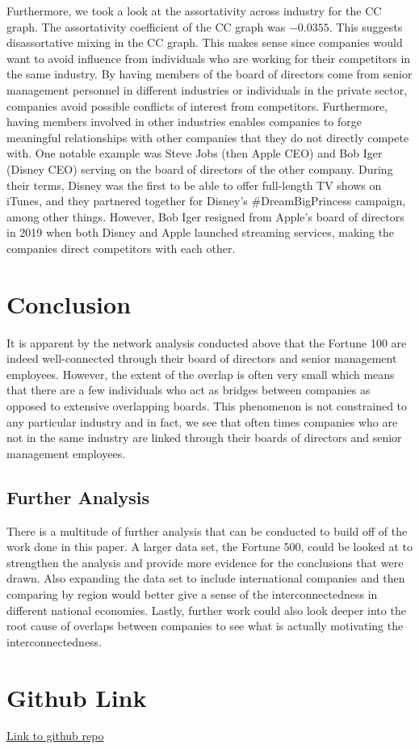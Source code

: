\documentclass[a4paper]{article}
\begin{document}
Furthermore, we took a look at the assortativity across industry for the CC graph. The assortativity coefficient of the CC graph was $-0.0355$. This suggests disassortative mixing in the CC graph. This makes sense since companies would want to avoid influence from individuals who are working for their competitors in the same industry. By having members of the board of directors come from senior management personnel in different industries or individuals in the private sector, companies avoid possible conflicts of interest from competitors. Furthermore, having members involved in other industries enables companies to forge meaningful relationships with other companies that they do not directly compete with. One notable example was Steve Jobs (then Apple CEO) and Bob Iger (Disney CEO) serving on the board of directors of the other company. During their terms, Disney was the first to be able to offer full-length TV shows on iTunes, and they partnered together for Disney's \#DreamBigPrincess campaign, among other things. However, Bob Iger resigned from Apple's board of directors in 2019 when both Disney and Apple launched streaming services, making the companies direct competitors with each other. 

\newpage
\section*{Conclusion}
It is apparent by the network analysis conducted above that the Fortune 100 are indeed well-connected through their board of directors and senior management employees. However, the extent of the overlap is often very small which means that there are a few individuals who act as bridges between companies as opposed to extensive overlapping boards. This phenomenon is not constrained to any particular industry and in fact, we see that often times companies who are not in the same industry are linked through their boards of directors and senior management employees.
    \subsection*{Further Analysis}
    There is a multitude of further analysis that can be conducted to build off of the work done in this paper. A larger data set, the Fortune 500, could be looked at to strengthen the analysis and provide more evidence for the conclusions that were drawn. Also expanding the data set to include international companies and then comparing by region would better give a sense of the interconnectedness in different national economies. Lastly, further work could also look deeper into the root cause of overlaps between companies to see what is actually motivating the interconnectedness.

\section*{Github Link}
\href{https://github.com/aneespatwa/cse416_fl2019_finalProject_AneesPatwa_ChenthuranAbeyakaran/}{Link to github repo}

\nocite{*}


\end{document}
